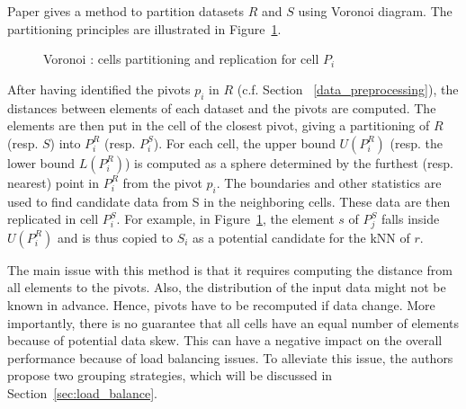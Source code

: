 \documentclass[10pt,journal,compsoc]{IEEEtran}
\newcommand{\TODO}[1]{\textcolor{red}{\textbf{[TODO:#1]}}}
\begin{document}
Paper \cite{Lu:2012:EPK:2336664.2336674} gives a method to partition  datasets $R$ and $S$ using Voronoi diagram. 
The partitioning principles are illustrated in Figure~\ref{fig:voronoi_partition_figure}. 
\begin{figure}[h]
\centering
{}
                \caption{Voronoi : cells partitioning and replication for cell $P_i$%
                }
                \label{fig:voronoi_partition_figure}         
\end{figure}%
After having identified the pivots $p_i$ in $R$ (c.f. Section~ \ref{data_preprocessing}), the distances between 
elements of each dataset and the pivots are computed. The elements are then put in the cell of the closest 
pivot, giving a partitioning of $R$ (resp. $S$) into $P_i^R$ (resp. $P_i^S$). For each cell, the upper bound 
$U(P^{R}_{i})$ (resp. the lower bound $L(P^{R}_{i})$) is computed as a sphere determined by the furthest (resp. 
nearest) point in $P_i^R$ from the pivot $p_i$.  The boundaries and other statistics are used to find 
candidate data from S in the neighboring cells. These data are then replicated in cell $P_i^S$. For example, in 
Figure~\ref{fig:voronoi_partition_figure}, the element $s$ of $P^{S}_{j}$ falls inside $U(P^{R}_{i})$ and is thus 
copied to $S_i$ as a potential candidate for the kNN of $r$.%



The main issue with this method is that it requires computing the distance from all elements to the pivots. Also, the distribution of the input data might 
not be known in advance. Hence, pivots have to be recomputed if data change.
 More importantly, there is no 
guarantee that all cells have an equal number of elements because of potential data skew. This can have a negative impact on the overall performance
because of load balancing issues. To alleviate this issue, the authors propose two grouping strategies, which will be discussed in 
Section~\ref{sec:load_balance}.
\end{document}
